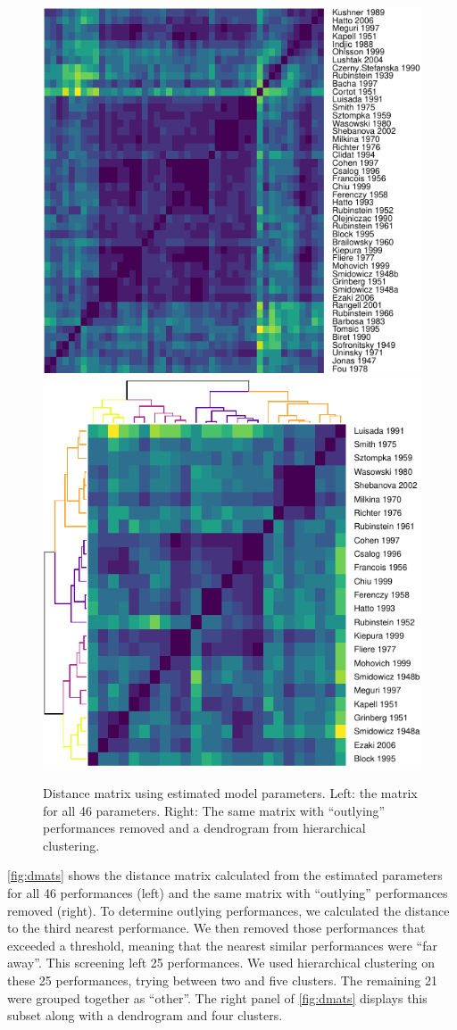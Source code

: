 \documentclass[aoas]{imsart}
\begin{document}
\begin{figure}[t]
  \centering
  \includegraphics[width=.45\linewidth]{parametric-clusters-1}
  \includegraphics[width=.45\linewidth]{parametric-clusters-2}
  \caption{Distance matrix using estimated model parameters. Left: the
    matrix for all 46 parameters. Right: The same matrix with
    ``outlying'' performances removed and a dendrogram from hierarchical
    clustering.}
  \label{fig:dmats}
\end{figure}
\autoref{fig:dmats} shows the distance matrix calculated from the
estimated parameters for all 46 performances (left) and the same
matrix with ``outlying'' performances removed (right). To determine
outlying performances, we calculated the distance to the third nearest
performance. We then removed those performances that exceeded a
threshold, meaning that the nearest similar performances were ``far
away''. This screening left 25 performances. We used hierarchical
clustering on these 25 performances, trying between two and five
clusters. The remaining 21 were grouped together as ``other''. The
right panel of \autoref{fig:dmats} displays this subset along with a
dendrogram and four clusters.
\end{document}
